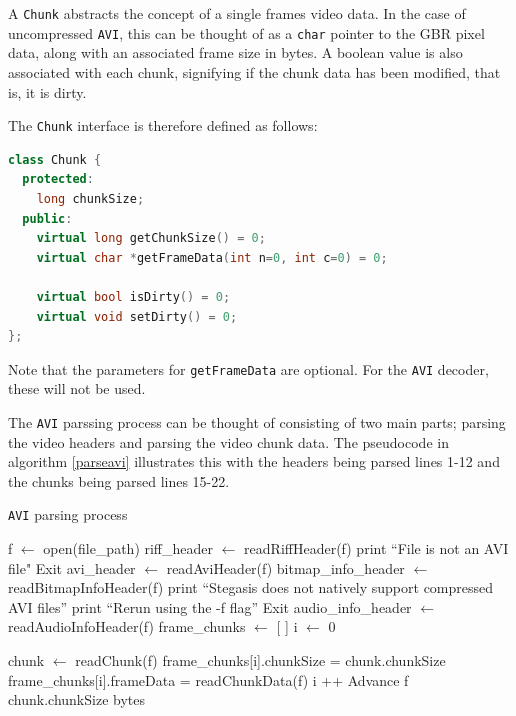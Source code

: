 \documentclass[paper=a4, fontsize=11pt,twoside]{scrartcl}
\numberwithin{table}{section}
\numberwithin{figure}{section}
\numberwithin{algorithm}{section}
\begin{document}
A \texttt{Chunk} abstracts the concept of a single frames video data. In the case of uncompressed \texttt{AVI}, this can be thought of as a \texttt{char} pointer to the GBR pixel data, along with an associated frame size in bytes. A boolean value is also associated with each chunk, signifying if the chunk data has been modified, that is, it is dirty.

The \texttt{Chunk} interface is therefore defined as follows:

\begin{lstlisting}[language=C++, caption={Chunk interface (\texttt{video/video\_decoder.h:4})}, frame=single]
class Chunk {
  protected:
    long chunkSize;
  public:
    virtual long getChunkSize() = 0;
    virtual char *getFrameData(int n=0, int c=0) = 0;
   
    virtual bool isDirty() = 0;
    virtual void setDirty() = 0;
};
\end{lstlisting}

\noindent
Note that the parameters for \texttt{getFrameData} are optional. For the \texttt{AVI} decoder, these will not be used.

The \texttt{AVI} parssing process can be thought of consisting of two main parts; parsing the video headers and parsing the video chunk data. The pseudocode in algorithm \ref{parseavi} illustrates this with the headers being parsed lines 1-12 and the chunks being parsed lines 15-22.

\begin{algorithm}[!h]
\caption{\texttt{AVI} parsing process}
\label{parseavi}
\begin{algorithmic}[1]
\State f $\gets$ open(file\_path)
\State riff\_header $\gets$ readRiffHeader(f)
	\State print ``File is not an AVI file"
	\State Exit
\EndIf
\State avi\_header $\gets$ readAviHeader(f)
\State bitmap\_info\_header $\gets$ readBitmapInfoHeader(f)
	\State print ``Stegasis does not natively support compressed AVI files''
	\State print ``Rerun using the -f flag''
	\State Exit
\EndIf
\State audio\_info\_header $\gets$ readAudioInfoHeader(f)
\State frame\_chunks $\gets$ [ ]
\State i $\gets$ 0

	\State chunk $\gets$ readChunk(f)
		\State frame\_chunks[i].chunkSize = chunk.chunkSize
		\State frame\_chunks[i].frameData = readChunkData(f)
		\State i ++
	\Else
		\State Advance f chunk.chunkSize bytes
	\EndIf
\EndWhile
\end{algorithmic}
\end{algorithm}
\end{document}

